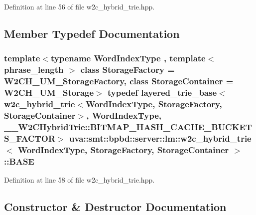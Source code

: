 Definition at line 56 of file w2c\+\_\+hybrid\+\_\+trie.\+hpp.



\subsection{Member Typedef Documentation}
\hypertarget{classuva_1_1smt_1_1bpbd_1_1server_1_1lm_1_1w2c__hybrid__trie_af338d2a485c15b92846dc6123fa0a305}{}
\subsubsection[{B\+A\+S\+E}]{\setlength{\rightskip}{0pt plus 5cm}template$<$typename Word\+Index\+Type , template$<$ phrase\+\_\+length $>$ class Storage\+Factory = W2\+C\+H\+\_\+\+U\+M\+\_\+\+Storage\+Factory, class Storage\+Container  = W2\+C\+H\+\_\+\+U\+M\+\_\+\+Storage$>$ typedef {\bf layered\+\_\+trie\+\_\+base}$<${\bf w2c\+\_\+hybrid\+\_\+trie}$<${\bf Word\+Index\+Type}, Storage\+Factory, Storage\+Container$>$, {\bf Word\+Index\+Type}, \+\_\+\+\_\+\+W2\+C\+Hybrid\+Trie\+::\+B\+I\+T\+M\+A\+P\+\_\+\+H\+A\+S\+H\+\_\+\+C\+A\+C\+H\+E\+\_\+\+B\+U\+C\+K\+E\+T\+S\+\_\+\+F\+A\+C\+T\+O\+R$>$ {\bf uva\+::smt\+::bpbd\+::server\+::lm\+::w2c\+\_\+hybrid\+\_\+trie}$<$ {\bf Word\+Index\+Type}, Storage\+Factory, Storage\+Container $>$\+::{\bf B\+A\+S\+E}}\label{classuva_1_1smt_1_1bpbd_1_1server_1_1lm_1_1w2c__hybrid__trie_af338d2a485c15b92846dc6123fa0a305}


Definition at line 58 of file w2c\+\_\+hybrid\+\_\+trie.\+hpp.



\subsection{Constructor \& Destructor Documentation}
\hypertarget{classuva_1_1smt_1_1bpbd_1_1server_1_1lm_1_1w2c__hybrid__trie_af7088cdf8ac483798132145ee7b4e18b}{}
